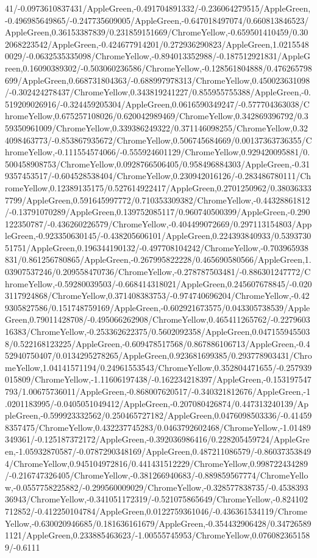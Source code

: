 {\begin{tikzternal}
41/-0.0973610837431/AppleGreen,-0.491704891332/-0.236064279515/AppleGreen,-0.496985649865/-0.247735609005/AppleGreen,-0.647018497074/0.660813846523/AppleGreen,0.36153387839/0.231859151669/ChromeYellow,-0.659501410459/0.302068223542/AppleGreen,-0.424677914201/0.272936290823/AppleGreen,1.02155480029/-0.0632535335098/ChromeYellow,-0.894013352988/-0.187512921831/AppleGreen,0.16090389302/-0.503060236586/ChromeYellow,-0.128561804888/0.476265798699/AppleGreen,0.668731804363/-0.688997978313/ChromeYellow,0.450023631098/-0.302424278437/ChromeYellow,0.343819241227/0.855955755388/AppleGreen,-0.519209026916/-0.324459205304/AppleGreen,0.0616590349247/-0.577704363038/ChromeYellow,0.675257108026/0.620042989469/ChromeYellow,0.342869396792/0.359350961009/ChromeYellow,0.339386249322/0.371146098255/ChromeYellow,0.324098463773/-0.853867935672/ChromeYellow,0.506745684669/0.00137363736355/ChromeYellow,-0.111554574066/-0.555924601129/ChromeYellow,0.929420095881/0.500458908753/ChromeYellow,0.0928766506405/0.958496884303/AppleGreen,-0.319357453517/-0.604528538404/ChromeYellow,0.230942016126/-0.283486780111/ChromeYellow,0.12389135175/0.527614922417/AppleGreen,0.2701250962/0.380363337799/AppleGreen,0.591645997772/0.710353309382/ChromeYellow,-0.44328861812/-0.13791070289/AppleGreen,0.139752085117/0.960740500399/AppleGreen,-0.290122350787/-0.436260226579/ChromeYellow,-0.404499072669/0.297113154803/AppleGreen,-0.923350630145/-0.438205606101/AppleGreen,0.224393840933/0.539373051751/AppleGreen,0.196344190132/-0.497708104242/ChromeYellow,-0.703965938831/0.861256780865/AppleGreen,-0.267995822228/0.465690580566/AppleGreen,1.03907537246/0.209558470736/ChromeYellow,-0.278787503481/-0.886301247772/ChromeYellow,-0.59280039503/-0.668414318021/AppleGreen,0.245607678845/-0.0203117924868/ChromeYellow,0.371408383753/-0.974740696204/ChromeYellow,-0.429305827586/0.151748759169/AppleGreen,-0.602921673575/0.043305738539/AppleGreen,0.79011428708/-0.495066262908/ChromeYellow,0.465411265762/-0.227960316383/ChromeYellow,-0.253362622375/0.5602092358/AppleGreen,0.0471559455038/0.522168123225/AppleGreen,-0.609478517568/0.867886106713/AppleGreen,-0.452940750407/0.0134295278265/AppleGreen,0.923681699385/0.293778903431/ChromeYellow,1.04141571194/0.24961553543/ChromeYellow,0.352804471655/-0.257939015809/ChromeYellow,-1.11606197438/-0.162234218397/AppleGreen,-0.153197547793/1.00675736011/AppleGreen,-0.868007620517/-0.340321812676/AppleGreen,-1.0201183995/-0.0405051049412/AppleGreen,-0.207080426874/0.447313240139/AppleGreen,-0.599923332562/0.250465727182/AppleGreen,0.0476098503336/-0.414598357475/ChromeYellow,0.432237745283/0.0463792602468/ChromeYellow,-1.01489349361/-0.125187372172/AppleGreen,-0.392036986416/0.228205459724/AppleGreen,-1.05932870587/-0.0787290348169/AppleGreen,0.487211086579/-0.860373538494/ChromeYellow,0.945104972816/0.441431512229/ChromeYellow,0.998722434289/-0.216747326405/ChromeYellow,-0.381266940683/-0.889859567774/ChromeYellow,-0.0557758225882/-0.299560009029/ChromeYellow,-0.328577838735/-0.453839336943/ChromeYellow,-0.341051172319/-0.521075865649/ChromeYellow,-0.824102712852/-0.412250104784/AppleGreen,0.0122759361046/-0.436361534119/ChromeYellow,-0.630020946685/0.181636161679/AppleGreen,-0.354432906428/0.347265891121/AppleGreen,0.233885463623/-1.00555745953/ChromeYellow,0.0760823651589/-0.6111
\end{tikzternal}}
